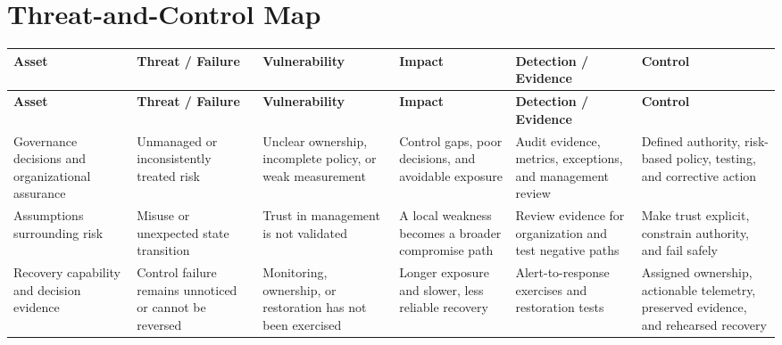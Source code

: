 \documentclass[11pt]{article}
\begin{document}
\section*{Threat-and-Control Map}
\begingroup\scriptsize\setlength{\tabcolsep}{2pt}
\begin{longtable}{>{\RaggedRight\arraybackslash}p{}>{\RaggedRight\arraybackslash}p{}>{\RaggedRight\arraybackslash}p{}>{\RaggedRight\arraybackslash}p{}>{\RaggedRight\arraybackslash}p{}>{\RaggedRight\arraybackslash}p{}}
\toprule\rowcolor{Navy}\color{white}\textbf{Asset} & \color{white}\textbf{Threat / Failure} & \color{white}\textbf{Vulnerability} & \color{white}\textbf{Impact} & \color{white}\textbf{Detection / Evidence} & \color{white}\textbf{Control}\\\midrule
\endfirsthead
\toprule\rowcolor{Navy}\color{white}\textbf{Asset} & \color{white}\textbf{Threat / Failure} & \color{white}\textbf{Vulnerability} & \color{white}\textbf{Impact} & \color{white}\textbf{Detection / Evidence} & \color{white}\textbf{Control}\\\midrule
\endhead
Governance decisions and organizational assurance & Unmanaged or inconsistently treated risk & Unclear ownership, incomplete policy, or weak measurement & Control gaps, poor decisions, and avoidable exposure & Audit evidence, metrics, exceptions, and management review & Defined authority, risk-based policy, testing, and corrective action\\\midrule
Assumptions surrounding risk & Misuse or unexpected state transition & Trust in management is not validated & A local weakness becomes a broader compromise path & Review evidence for organization and test negative paths & Make trust explicit, constrain authority, and fail safely\\\midrule
Recovery capability and decision evidence & Control failure remains unnoticed or cannot be reversed & Monitoring, ownership, or restoration has not been exercised & Longer exposure and slower, less reliable recovery & Alert-to-response exercises and restoration tests & Assigned ownership, actionable telemetry, preserved evidence, and rehearsed recovery\\\midrule
\bottomrule
\end{longtable}
\endgroup
\end{document}
